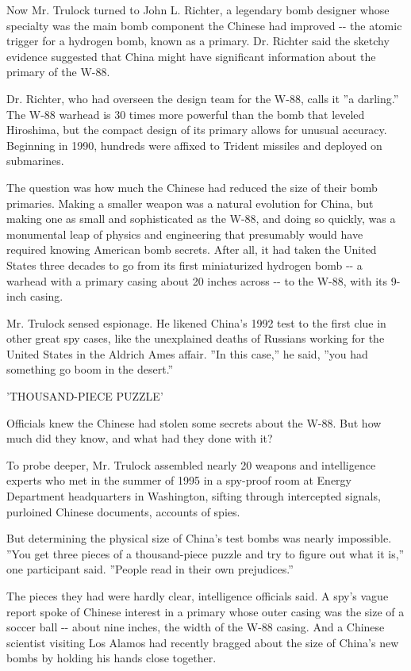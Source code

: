 Now Mr. Trulock turned to John L. Richter, a legendary bomb designer
whose specialty was the main bomb component the Chinese had improved
-\/- the atomic trigger for a hydrogen bomb, known as a primary. Dr.
Richter said the sketchy evidence suggested that China might have
significant information about the primary of the W-88.

Dr. Richter, who had overseen the design team for the W-88, calls it ''a
darling.'' The W-88 warhead is 30 times more powerful than the bomb that
leveled Hiroshima, but the compact design of its primary allows for
unusual accuracy. Beginning in 1990, hundreds were affixed to Trident
missiles and deployed on submarines.

The question was how much the Chinese had reduced the size of their bomb
primaries. Making a smaller weapon was a natural evolution for China,
but making one as small and sophisticated as the W-88, and doing so
quickly, was a monumental leap of physics and engineering that
presumably would have required knowing American bomb secrets. After all,
it had taken the United States three decades to go from its first
miniaturized hydrogen bomb -\/- a warhead with a primary casing about 20
inches across -\/- to the W-88, with its 9-inch casing.

Mr. Trulock sensed espionage. He likened China's 1992 test to the first
clue in other great spy cases, like the unexplained deaths of Russians
working for the United States in the Aldrich Ames affair. ''In this
case,'' he said, ''you had something go boom in the desert.''

'THOUSAND-PIECE PUZZLE'

Officials knew the Chinese had stolen some secrets about the W-88. But
how much did they know, and what had they done with it?

To probe deeper, Mr. Trulock assembled nearly 20 weapons and
intelligence experts who met in the summer of 1995 in a spy-proof room
at Energy Department headquarters in Washington, sifting through
intercepted signals, purloined Chinese documents, accounts of spies.

But determining the physical size of China's test bombs was nearly
impossible. ''You get three pieces of a thousand-piece puzzle and try to
figure out what it is,'' one participant said. ''People read in their
own prejudices.''

The pieces they had were hardly clear, intelligence officials said. A
spy's vague report spoke of Chinese interest in a primary whose outer
casing was the size of a soccer ball -\/- about nine inches, the width
of the W-88 casing. And a Chinese scientist visiting Los Alamos had
recently bragged about the size of China's new bombs by holding his
hands close together.


